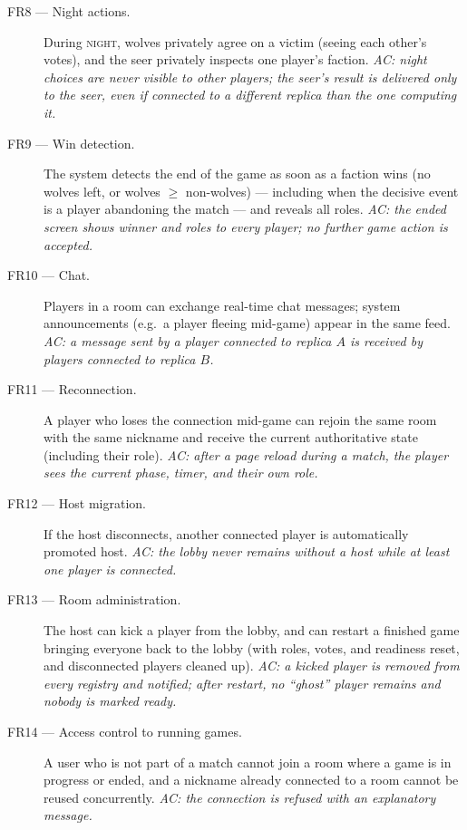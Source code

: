 \documentclass{scrartcl}
\begin{document}
\begin{description}
  \item[FR8 --- Night actions.] During \textsc{night}, wolves privately
  agree on a victim (seeing each other's votes), and the seer privately
  inspects one player's faction. \emph{AC: night choices are never visible
  to other players; the seer's result is delivered only to the seer, even
  if connected to a different replica than the one computing it.}

  \item[FR9 --- Win detection.] The system detects the end of the game as
  soon as a faction wins (no wolves left, or wolves $\geq$ non-wolves) ---
  including when the decisive event is a player abandoning the match ---
  and reveals all roles. \emph{AC: the ended screen shows winner and roles
  to every player; no further game action is accepted.}

  \item[FR10 --- Chat.] Players in a room can exchange real-time chat
  messages; system announcements (e.g.\ a player fleeing mid-game) appear
  in the same feed. \emph{AC: a message sent by a player connected to
  replica $A$ is received by players connected to replica $B$.}

  \item[FR11 --- Reconnection.] A player who loses the connection mid-game
  can rejoin the same room with the same nickname and receive the current
  authoritative state (including their role). \emph{AC: after a page
  reload during a match, the player sees the current phase, timer, and
  their own role.}

  \item[FR12 --- Host migration.] If the host disconnects, another
  connected player is automatically promoted host. \emph{AC: the lobby
  never remains without a host while at least one player is connected.}

  \item[FR13 --- Room administration.] The host can kick a player from the
  lobby, and can restart a finished game bringing everyone back to the
  lobby (with roles, votes, and readiness reset, and disconnected players
  cleaned up). \emph{AC: a kicked player is removed from every registry
  and notified; after restart, no ``ghost'' player remains and nobody is
  marked ready.}

  \item[FR14 --- Access control to running games.] A user who is not part of
  a match cannot join a room where a game is in progress or ended, and a
  nickname already connected to a room cannot be reused concurrently.
  \emph{AC: the connection is refused with an explanatory message.}
\end{description}
\end{document}
